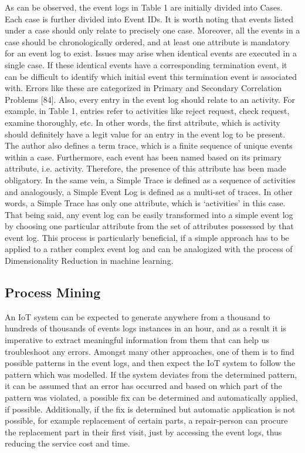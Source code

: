As can be observed, the event logs in Table 1 are initially divided into Cases. Each case is further divided into Event IDs. It is worth noting that events listed under a case should only relate to precisely one case. Moreover, all the events in a case should be chronologically ordered, and at least one attribute is mandatory for an event log to exist. Issues may arise when identical events are executed in a single case. If these identical events have a corresponding termination event, it can be difficult to identify which initial event this termination event is associated with. Errors like these are categorized in Primary and Secondary Correlation Problems [84]. Also, every entry in the event log should relate to an activity. For example, in Table 1, entries refer to activities like reject request, check request, examine thoroughly, etc. In other words, the first attribute, which is activity should definitely have a legit value for an entry in the event log to be present. The author also defines a term trace, which is a finite sequence of unique events within a case. Furthermore, each event has been named based on its primary attribute, i.e. activity. Therefore, the presence of this attribute has been made obligatory. In the same vein, a Simple Trace is defined as a sequence of activities and analogously, a Simple Event Log is defined as a multi-set of traces. In other words, a Simple Trace has only one attribute, which is ‘activities’ in this case. That being said, any event log can be easily transformed into a simple event log by choosing one particular attribute from the set of attributes possessed by that event log. This process is particularly beneficial, if a simple approach has to be applied to a rather complex event log and can be analogized with the process of Dimensionality Reduction in machine learning.

\subsection{Process Mining}

An IoT system can be expected to generate anywhere from a thousand to hundreds of thousands of events logs instances in an hour, and as a result it is imperative to extract meaningful information from them that can help us troubleshoot any errors. Amongst many other approaches, one of them is to find possible patterns in the event logs, and then expect the IoT system to follow the pattern which was modelled. If the system deviates from the determined pattern, it can be assumed that an error has occurred and based on which part of the pattern was violated, a possible fix can be determined and automatically applied, if possible. Additionally, if the fix is determined but automatic application is not possible, for example replacement of certain parts, a repair-person can procure the replacement part in their first visit, just by accessing the event logs, thus reducing the service cost and time. 

